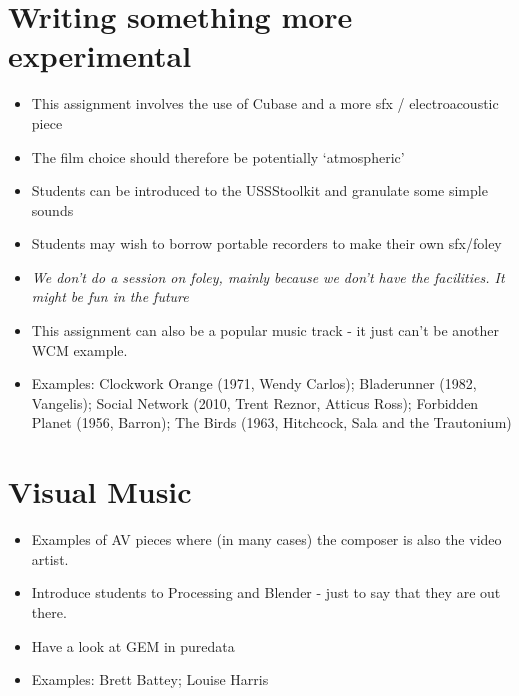 \section{Writing something more experimental}
\begin{itemize}
\item This assignment involves the use of Cubase and a more sfx / electroacoustic piece
\item The film choice should therefore be potentially `atmospheric'
\item Students can be introduced to the USSStoolkit and granulate some simple sounds
\item Students may wish to borrow portable recorders to make their own sfx/foley
\item \textit{We don't do a session on foley, mainly because we don't have the facilities. It might be fun in the future}
\item This assignment can also be a popular music track - it just can't be another WCM example. 
\item Examples: Clockwork Orange (1971, Wendy Carlos); Bladerunner (1982, Vangelis); Social Network (2010, Trent Reznor, Atticus Ross); Forbidden Planet (1956, Barron); The Birds (1963, Hitchcock, Sala and the Trautonium)
\end{itemize}

\section{Visual Music}
\begin{itemize}
\item Examples of AV pieces where (in many cases) the composer is also the video artist. 
\item Introduce students to Processing and Blender - just to say that they are out there. 
\item Have a look at GEM in puredata 
\item Examples: Brett Battey; Louise Harris
\end{itemize}

